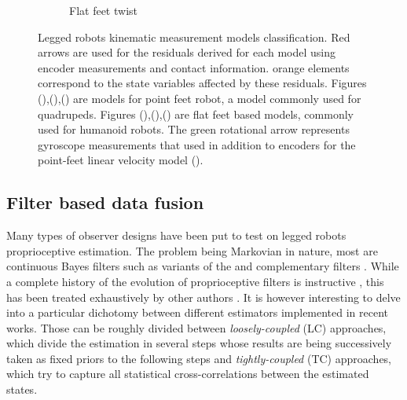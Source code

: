 \begin{figure}
\begin{subfigure}{.33\linewidth}
        \caption{Flat feet twist}
    \end{subfigure}%
    \caption{Legged robots kinematic measurement models classification. Red arrows are used for the residuals derived for each model using encoder measurements and contact information. 
    orange elements correspond to the state variables affected by these residuals. Figures (),(),() are models
    for point feet robot, a model commonly used for quadrupeds. Figures (),(),() are flat feet based models,
    commonly used for humanoid robots. The green rotational arrow represents gyroscope measurements that used in addition to encoders for the point-feet linear velocity model ().
        }
    \label{fig:kin_models}
\end{figure}


\subsection{Filter based data fusion}
\label{sec:proprio_filters}

Many types of observer designs have been put to test on legged robots proprioceptive estimation. The problem being Markovian in nature,
most are continuous Bayes filters such as variants of the \KalmanF \cite{kalman1960new} and complementary filters \cite{higgins1975comparison}. While a complete history of 
the evolution of proprioceptive filters is instructive 
\cite{gassmann2005localization, lin2005leg, lin2006sensor, cobano2008location, aoustin2008experimental, lebastard2011estimation, chilian2011multisensor, reinstein2011dead, 
gur2012model, ma2012robust, gorner2013leg}, 
this has been treated exhaustively by other authors \cite{bloesch2017state, camurri2017multisensory}. 
It is however interesting to delve into a particular dichotomy between different estimators implemented in recent works. Those can be 
roughly divided between \textit{loosely-coupled} (LC) approaches, which divide the estimation in several steps whose results are being successively taken as fixed priors to the 
following steps and \textit{tightly-coupled} (TC) approaches, which try to capture all statistical cross-correlations between the estimated states.


